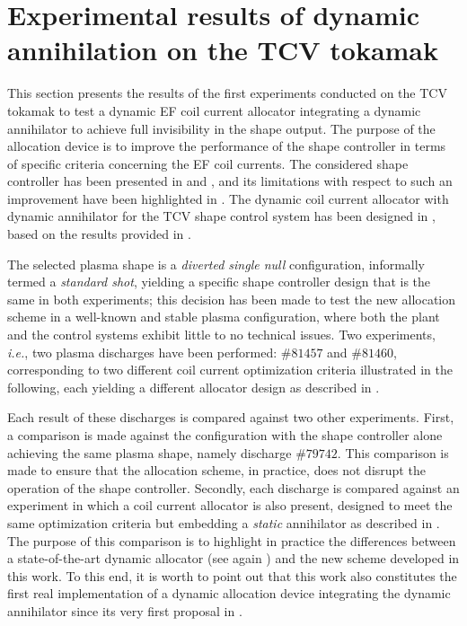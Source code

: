 \section{Experimental results of dynamic annihilation on the TCV tokamak}
\label{sec:shots}
This section presents the results of the first experiments conducted on the TCV tokamak to test a dynamic EF coil current allocator integrating a dynamic annihilator to achieve full invisibility in the shape output. The purpose of the allocation device is to improve the performance of the shape controller in terms of specific criteria concerning the EF coil currents. The considered shape controller has been presented in  and \cite{mele_design_2024}, and its limitations with respect to such an improvement have been highlighted in . The dynamic coil current allocator with dynamic annihilator for the TCV shape control system has been designed in , based on the results provided in .

The selected plasma shape is a \emph{diverted single null} configuration, informally termed a \emph{standard shot}, yielding a specific shape controller design that is the same in both experiments; this decision has been made to test the new allocation scheme in a well-known and stable plasma configuration, where both the plant and the control systems exhibit little to no technical issues. Two experiments, \emph{i.e.}, two plasma discharges have been performed: $\#81457$ and $\#81460$, corresponding to two different coil current optimization criteria illustrated in the following, each yielding a different allocator design as described in .

Each result of these discharges is compared against two other experiments. First, a comparison is made against the configuration with the shape controller alone achieving the same plasma shape, namely discharge $\#79742$. This comparison is made to ensure that the allocation scheme, in practice, does not disrupt the operation of the shape controller. Secondly, each discharge is compared against an experiment in which a coil current allocator is also present, designed to meet the same optimization criteria but embedding a \emph{static} annihilator as described in \cite{tenaglia_dynamic_2024}. The purpose of this comparison is to highlight in practice the differences between a state-of-the-art dynamic allocator (see again ) and the new scheme developed in this work. To this end, it is worth to point out that this work also constitutes the first real implementation of a dynamic allocation device integrating the dynamic annihilator since its very first proposal in \cite{cristofaro_output_2014}.

